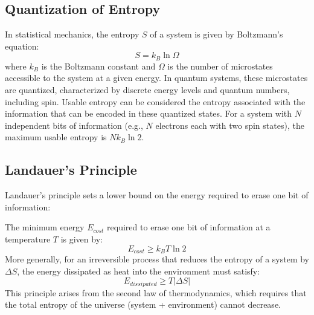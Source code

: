 	\subsection{Quantization of Entropy}
	In statistical mechanics, the entropy $S$ of a system is given by Boltzmann's equation:
	\begin{equation}
		S = k_B \ln \Omega
	\end{equation}
	where $k_B$ is the Boltzmann constant and $\Omega$ is the number of microstates accessible to the system at a given energy. In quantum systems, these microstates are quantized, characterized by discrete energy levels and quantum numbers, including spin. Usable entropy can be considered the entropy associated with the information that can be encoded in these quantized states. For a system with $N$ independent bits of information (e.g., $N$ electrons each with two spin states), the maximum usable entropy is $N k_B \ln 2$.
	
	\subsection{Landauer's Principle}
	Landauer's principle sets a lower bound on the energy required to erase one bit of information:
	\begin{theorem}
		The minimum energy $E_{cost}$ required to erase one bit of information at a temperature $T$ is given by:
		\begin{equation}
			E_{cost} \ge k_B T \ln 2
		\end{equation}
		More generally, for an irreversible process that reduces the entropy of a system by $\Delta S$, the energy dissipated as heat into the environment must satisfy:
		\begin{equation}
			E_{dissipated} \ge T |\Delta S|
		\end{equation}
		This principle arises from the second law of thermodynamics, which requires that the total entropy of the universe (system + environment) cannot decrease.
	\end{theorem}
